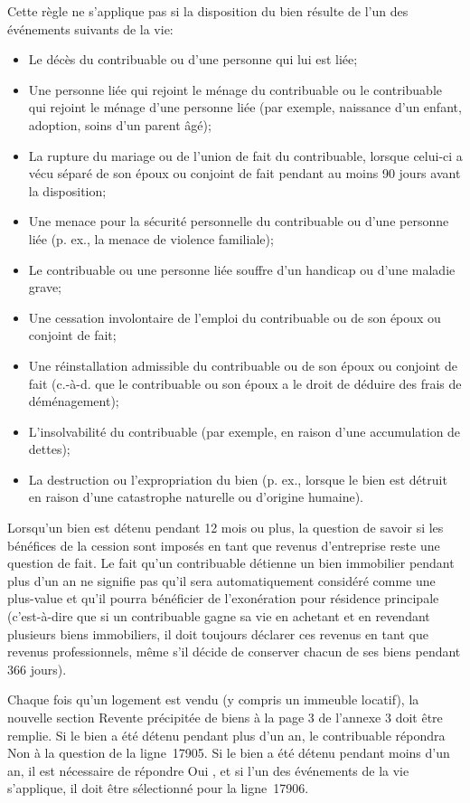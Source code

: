 Cette règle ne s'applique pas si la disposition du bien résulte de l'un des événements suivants de la vie:
\begin{itemize}
	\item Le décès du contribuable ou d'une personne qui lui est liée;
	\item Une personne liée qui rejoint le ménage du contribuable ou le contribuable qui rejoint le ménage d'une personne liée (par exemple, naissance d'un enfant, adoption, soins d'un parent âgé);
	\item La rupture du mariage ou de l'union de fait du contribuable, lorsque celui-ci a vécu séparé de son époux ou conjoint de fait pendant au moins 90 jours avant la disposition;
	\item Une menace pour la sécurité personnelle du contribuable ou d'une personne liée (p. ex., la menace de violence familiale);
	\item Le contribuable ou une personne liée souffre d'un handicap ou d'une maladie grave;
	\item Une cessation involontaire de l'emploi du contribuable ou de son époux ou conjoint de fait;
	\item Une réinstallation admissible du contribuable ou de son époux ou conjoint de fait (c.-à-d. que le contribuable ou son époux a le droit de déduire des frais de déménagement);
	\item L'insolvabilité du contribuable (par exemple, en raison d'une accumulation de dettes);
	\item La destruction ou l'expropriation du bien (p. ex., lorsque le bien est détruit en raison d'une catastrophe naturelle ou d'origine humaine).
\end{itemize}

Lorsqu'un bien est détenu pendant 12 mois ou plus, la question de savoir si les bénéfices de la cession sont imposés en tant que revenus d'entreprise reste une question de fait. Le fait qu'un contribuable détienne un bien immobilier pendant plus d'un an ne signifie pas qu'il sera automatiquement considéré comme une plus-value et qu'il pourra bénéficier de l'exonération pour résidence principale (c'est-à-dire que si un contribuable gagne sa vie en achetant et en revendant plusieurs biens immobiliers, il doit toujours déclarer ces revenus en tant que revenus professionnels, même s'il décide de conserver chacun de ses biens pendant 366 jours).

Chaque fois qu'un logement est vendu (y compris un immeuble locatif), la nouvelle section Revente précipitée de biens à la page 3 de l'annexe 3 doit être remplie. Si le bien a été détenu pendant plus d'un an, le contribuable répondra \og Non \fg{} à la question de la ligne~17905. Si le bien a été détenu pendant moins d'un an, il est nécessaire de répondre \og Oui \fg{}, et si l'un des événements de la vie s'applique, il doit être sélectionné pour la ligne~17906.

